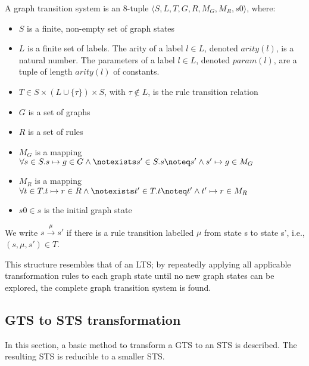 \begin{definition}
A graph transition system is an 8-tuple	$\langle S, L, T, G, R, M_G, M_R, s0\rangle$, where:
\begin{itemize}
\item $S$ is a finite, non-empty set of graph states
\item $L$ is a finite set of labels. The arity of a label $l\in L$, denoted $arity(l)$, is a natural number. The parameters of a label $l\in L$, denoted $param(l)$, are a tuple of length $arity(l)$ of constants.
\item $T \in S \times (L \cup \{\tau\}) \times S$, with $\tau \notin L$, is the rule transition relation
\item $G$ is a set of graphs
\item $R$ is a set of rules
\item $M_G$ is a mapping $\forall s \in S . s \mapsto g \in G \land \notexists s' \in S . s \noteq s' \land s' \mapsto g \in M_G$
\item $M_R$ is a mapping $\forall t \in T . t \mapsto r \in R \land \notexists t' \in T . t \noteq t' \land t' \mapsto r \in M_R$
\item $s0 \in s$ is the initial graph state
\end{itemize}
We write $s \xrightarrow{\mu}s'$ if there is a rule transition labelled $\mu$ from state s to state s', i.e., $(s, \mu, s') \in T$.
\end{definition}

This structure resembles that of an LTS; by repeatedly applying all applicable transformation rules to each graph state until no new graph states can be explored, the complete graph transition system is found.

\subsection{GTS to STS transformation}
In this section, a basic method to transform a GTS to an STS is described. The resulting STS is reducible to a smaller STS.

